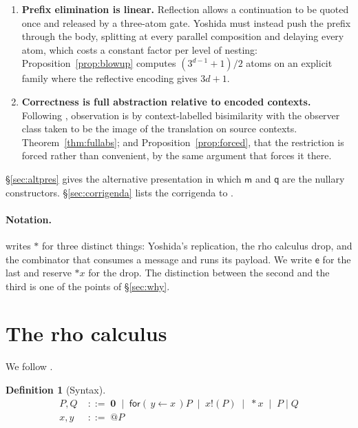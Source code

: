 \documentclass[11pt]{article}
\makeatletter
\theoremstyle{plain}
\theoremstyle{definition}
\newtheorem{definition}[theorem]{Definition}
\theoremstyle{remark}
\newcommand{\quo}[1]{@#1}
\newcommand{\drp}[1]{{*}#1}
\newcommand{\inp}[3]{\mathsf{for}(\,#1 \leftarrow #2\,)#3}
\newcommand{\out}[2]{#1!(#2)}
\newcommand{\nil}{\mathbf{0}}
\newcommand{\mm}{\mathsf{m}}
\newcommand{\ev}{\mathsf{e}}
\newcommand{\qq}{\mathsf{q}}
\makeatother
\begin{document}
\begin{enumerate}[leftmargin=1.6em]
\item \textbf{Prefix elimination is linear.} Reflection allows a continuation
to be quoted once and released by a three-atom gate. Yoshida must instead
push the prefix through the body, splitting at every parallel composition and
delaying every atom, which costs a constant factor per level of nesting:
Proposition~\ref{prop:blowup} computes $(3^{d-1}+1)/2$ atoms on an explicit
family where the reflective encoding gives $3d+1$.

\item \textbf{Correctness is full abstraction relative to encoded contexts.}
Following \cite{nowns}, observation is by context-labelled bisimilarity with
the observer class taken to be the image of the translation on source
contexts. Theorem~\ref{thm:fullabs}; and Proposition~\ref{prop:forced}, that
the restriction is forced rather than convenient, by the same argument that
forces it there.

\end{enumerate}

\S\ref{sec:altpres} gives the alternative presentation in which $\mm$ and
$\qq$ are the nullary constructors. \S\ref{sec:corrigenda} lists the
corrigenda to \cite{rhocomb}.

\paragraph{Notation.} \cite{rhocomb} writes $\mathsf{*}$ for three distinct
things: Yoshida's replication, the rho calculus drop, and the combinator that
consumes a message and runs its payload. We write $\ev$ for the last and
reserve $\drp{x}$ for the drop. The distinction between the second and the
third is one of the points of \S\ref{sec:why}.

\section{The rho calculus}
\label{sec:rho}

We follow \cite{MeredithRadestock05}.

\begin{definition}[Syntax]
\begin{align*}
  P,Q &\;::=\; \nil \;\mid\; \inp{y}{x}{P} \;\mid\; \out{x}{P}
        \;\mid\; \drp{x} \;\mid\; P \mid Q\\
  x,y &\;::=\; \quo{P}
\end{align*}
\end{definition}
\end{document}
